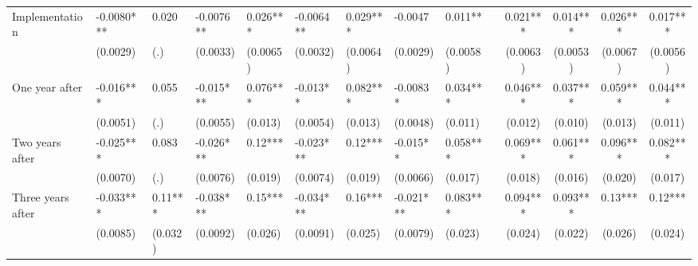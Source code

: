 \begin{tabular}{lccccrrrrrcccc}
Implementation & \multicolumn{1}{l}{-0.0080***} & \multicolumn{1}{l}{0.020} & \multicolumn{1}{l}{-0.0076**} & \multicolumn{1}{l}{0.026***} & \multicolumn{1}{l}{-0.0064**} & \multicolumn{1}{l}{0.029***} & \multicolumn{1}{l}{-0.0047} & \multicolumn{1}{l}{0.011**} &       & 0.021*** & 0.014*** & 0.026*** & 0.017*** \\
      & \multicolumn{1}{l}{(0.0029)} & \multicolumn{1}{l}{(.)} & \multicolumn{1}{l}{(0.0033)} & \multicolumn{1}{l}{(0.0065)} & \multicolumn{1}{l}{(0.0032)} & \multicolumn{1}{l}{(0.0064)} & \multicolumn{1}{l}{(0.0029)} & \multicolumn{1}{l}{(0.0058)} &       & (0.0063) & (0.0053) & (0.0067) & (0.0056) \\
One year after & \multicolumn{1}{l}{-0.016***} & \multicolumn{1}{l}{0.055} & \multicolumn{1}{l}{-0.015***} & \multicolumn{1}{l}{0.076***} & \multicolumn{1}{l}{-0.013**} & \multicolumn{1}{l}{0.082***} & \multicolumn{1}{l}{-0.0083*} & \multicolumn{1}{l}{0.034***} &       & 0.046*** & 0.037*** & 0.059*** & 0.044*** \\
      & \multicolumn{1}{l}{(0.0051)} & \multicolumn{1}{l}{(.)} & \multicolumn{1}{l}{(0.0055)} & \multicolumn{1}{l}{(0.013)} & \multicolumn{1}{l}{(0.0054)} & \multicolumn{1}{l}{(0.013)} & \multicolumn{1}{l}{(0.0048)} & \multicolumn{1}{l}{(0.011)} &       & (0.012) & (0.010) & (0.013) & (0.011) \\
Two years after & \multicolumn{1}{l}{-0.025***} & \multicolumn{1}{l}{0.083} & \multicolumn{1}{l}{-0.026***} & \multicolumn{1}{l}{0.12***} & \multicolumn{1}{l}{-0.023***} & \multicolumn{1}{l}{0.12***} & \multicolumn{1}{l}{-0.015**} & \multicolumn{1}{l}{0.058***} &       & 0.069*** & 0.061*** & 0.096*** & 0.082*** \\
      & \multicolumn{1}{l}{(0.0070)} & \multicolumn{1}{l}{(.)} & \multicolumn{1}{l}{(0.0076)} & \multicolumn{1}{l}{(0.019)} & \multicolumn{1}{l}{(0.0074)} & \multicolumn{1}{l}{(0.019)} & \multicolumn{1}{l}{(0.0066)} & \multicolumn{1}{l}{(0.017)} &       & (0.018) & (0.016) & (0.020) & (0.017) \\
Three years after & \multicolumn{1}{l}{-0.033***} & \multicolumn{1}{l}{0.11***} & \multicolumn{1}{l}{-0.038***} & \multicolumn{1}{l}{0.15***} & \multicolumn{1}{l}{-0.034***} & \multicolumn{1}{l}{0.16***} & \multicolumn{1}{l}{-0.021***} & \multicolumn{1}{l}{0.083***} &       & 0.094*** & 0.093*** & 0.13*** & 0.12*** \\
      & \multicolumn{1}{l}{(0.0085)} & \multicolumn{1}{l}{(0.032)} & \multicolumn{1}{l}{(0.0092)} & \multicolumn{1}{l}{(0.026)} & \multicolumn{1}{l}{(0.0091)} & \multicolumn{1}{l}{(0.025)} & \multicolumn{1}{l}{(0.0079)} & \multicolumn{1}{l}{(0.023)} &       & (0.024) & (0.022) & (0.026) & (0.024) \\

\end{tabular}
